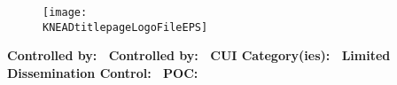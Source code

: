 {%

	\ifthenelse{\equal{\KNEADtitlepageLogoFileEPS}{}}{}
	{
		\vfill
		
		\begin{figure}[htbp]
			\centering
				\texttt{[image: \\KNEADtitlepageLogoFileEPS]}
		\end{figure}
	}%

	\vfill

	\begin{center}
		\KNEADtitlepageTitle
	\end{center}
	
	\vfill

	\ifthenelse{\equal{\KNEADtitlepageCompanyInfo}{}}{}
	{
		\ifthenelse{\equal{\KNEADtitlepageCompanyHeader}{}}{}
		{
			\begin{center}
				\singlespace
				\KNEADtitlepageCompanyHeader
			\end{center}
		}%
				
		\begin{center}
			\singlespace
			\KNEADtitlepageCompanyInfo
		\end{center}
			
		\vfill

	} %
	
	\ifthenelse{\equal{\KNEADcuiStatus}{}}
	{
		\ifthenelse{\equal{\KNEADtitlepageDistributionStatement}{}}{}
		{
			\linespread{0.75}\selectfont  
			{
				\begin{center}
					\bfseries \KNEADtitlepageDistributionStatement
				\end{center}
			}
		}
	}%
	{%
		\linespread{0.75}\selectfont  
		{
			\begin{flushleft}
				\bfseries Controlled by:~\KNEADcuiCOMPONENT\break
				\bfseries Controlled by:~\KNEADcuiOFFICE\break
				\bfseries CUI Category(ies):~\KNEADcuiCATEGORIES\break
				\bfseries Limited Dissemination Control:~\KNEADcuiDISTRIBUTION\break
				\bfseries POC:~\KNEADcuiPOC\break
			\end{flushleft}
			\begin{center}
				\bfseries \KNEADcuiTitlepageDistributionStatement
			\end{center}
		}
	}


}%